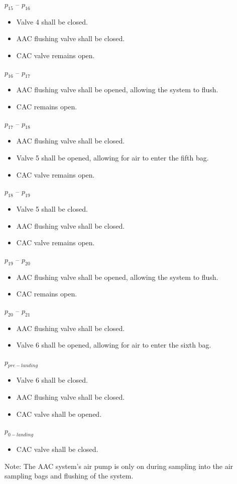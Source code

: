 $p_{15}$ – $p_{16}$
\begin{itemize}
    \item Valve 4 shall be closed.
    \item AAC flushing valve shall be closed.
    \item CAC valve remains open.
\end{itemize}

$p_{16}$ – $p_{17}$
\begin{itemize}
    \item AAC flushing valve shall be opened, allowing the system to flush. 
    \item CAC remains open.
  \end{itemize}

$p_{17}$ – $p_{18}$
\begin{itemize}
    \item AAC flushing valve shall be closed.
    \item Valve 5 shall be opened, allowing for air to enter the fifth bag. 
    \item CAC valve remains open.
\end{itemize}

$p_{18}$ – $p_{19}$
\begin{itemize}
    \item Valve 5 shall be closed.
    \item AAC flushing valve shall be closed.
    \item CAC valve remains open.
\end{itemize}

$p_{19}$ – $p_{20}$
\begin{itemize}
     \item AAC flushing valve shall be opened, allowing the system to flush. 
    \item CAC remains open.
   \end{itemize}

$p_{20}$ – $p_{21}$
\begin{itemize}
    \item AAC flushing valve shall be closed.
    \item Valve 6 shall be opened, allowing for air to enter the sixth bag.
\end{itemize}

$p_{pre-landing}$ 
\begin{itemize}
    \item Valve 6 shall be closed.
    \item AAC flushing valve shall be closed.
    \item CAC valve shall be opened.
\end{itemize}

$p_{0-landing}$
\begin{itemize}
    \item CAC valve shall be closed.
\end{itemize}


Note: The AAC system's air pump is only on during sampling into the air sampling bags and flushing of the system.


\raggedbottom
